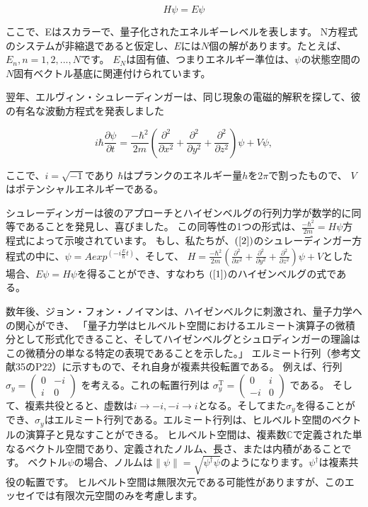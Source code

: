 \begin{equation}
\label{1}
H \psi = E \psi
\end{equation}

ここで、Eはスカラーで、量子化されたエネルギーレベルを表します。
N方程式のシステムが非縮退であると仮定し、$E$には$N$個の解があります。たとえば、$E_n, n = 1,2,...,N$です。
$E_N$は固有値、つまりエネルギー準位は、$\psi$の状態空間の$N$固有ベクトル基底に関連付けられています。

翌年、エルヴィン・シュレーディンガーは、同じ現象の電磁的解釈を探して、彼の有名な波動方程式を発表しました

\begin{equation}
\label{2}
i \hbar \frac{\partial \psi}{\partial t} 
= \frac{- \hbar^2}{2m}
\left(    
\frac{\partial^2}{\partial x^2} + \frac{\partial^2}{\partial y^2} + \frac{\partial^2}{\partial z^2}   
\right) \psi + V \psi,
\end{equation}

ここで、$ i = \sqrt{-1} $であり $\hbar$はプランクのエネルギー量$h$を$2 \pi$で割ったもので、
$V$はポテンシャルエネルギーである。

シュレーディンガーは彼のアプローチとハイゼンベルグの行列力学が数学的に同等であることを発見し、喜びました。
この同等性の1つの形式は、$\frac{- \hbar^2}{2m} = H \psi$方程式によって示唆されています。
もし、私たちが、$(\ref{2})$のシュレーディンガー方程式の中に、$\psi = A exp^{(-i \frac{E}{\hbar}t)}$、そして、
$ H = \frac{- \hbar^2}{2m}
\left(    
\frac{\partial^2}{\partial x^2} + \frac{\partial^2}{\partial y^2} + \frac{\partial^2}{\partial z^2}   
\right) \psi + V $とした場合、$ E \psi = H \psi $を得ることができ、すなわち $(\ref{1})$のハイゼンベルグの式である。

数年後、ジョン・フォン・ノイマンは、ハイゼンベルクに刺激され、量子力学への関心ができ、
「量子力学はヒルベルト空間におけるエルミート演算子の微積分として形式化できること、そしてハイゼンベルグとシュロディンガーの理論はこの微積分の単なる特定の表現であることを示した。」 
エルミート行列（参考文献35のP22）に示すもので、それ自身が複素共役転置である。
例えば、行列 $ \sigma_y = \left(  
\begin{array}{ccc}
 0 & -i \\
 i & 0 
\end{array}
\right) $ を考える。これの転置行列は
 $ \sigma_y^{\mathrm{T}} = \left(  
\begin{array}{ccc}
 0 & i \\
 -i & 0 
\end{array}
\right) $ 
である。
そして、複素共役とると、虚数は$i \rightarrow -i, -i \rightarrow i $となる。そしてまた$\sigma_y$を得ることができ、$\sigma_y$はエルミート行列である。エルミート行列は、ヒルベルト空間のベクトルの演算子と見なすことができる。
ヒルベルト空間は、複素数$\mathbb{C}$で定義された単なるベクトル空間であり、定義されたノルム、長さ、または内積があることです。
ベクトル$\psi$の場合、ノルムは$ \parallel \psi \parallel = \sqrt{\psi^{\dagger} \psi} $のようになります。$\psi^{\dagger}$は複素共役の転置です。
ヒルベルト空間は無限次元である可能性がありますが、このエッセイでは有限次元空間のみを考慮します。

